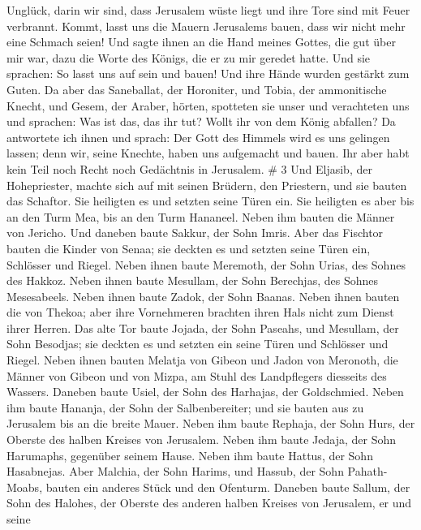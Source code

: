 Unglück, darin wir sind, dass Jerusalem wüste liegt und ihre Tore sind
mit Feuer verbrannt. Kommt, lasst uns die Mauern Jerusalems bauen, dass
wir nicht mehr eine Schmach seien!  Und sagte ihnen an die
Hand meines Gottes, die gut über mir war, dazu die Worte des Königs, die
er zu mir geredet hatte. Und sie sprachen: So lasst uns auf sein und
bauen! Und ihre Hände wurden gestärkt zum Guten.  Da aber
das Saneballat, der Horoniter, und Tobia, der ammonitische Knecht, und
Gesem, der Araber, hörten, spotteten sie unser und verachteten uns und
sprachen: Was ist das, das ihr tut? Wollt ihr von dem König abfallen?
 Da antwortete ich ihnen und sprach: Der Gott des Himmels
wird es uns gelingen lassen; denn wir, seine Knechte, haben uns
aufgemacht und bauen. Ihr aber habt kein Teil noch Recht noch Gedächtnis
in Jerusalem. \# 3  Und Eljasib, der Hohepriester, machte
sich auf mit seinen Brüdern, den Priestern, und sie bauten das Schaftor.
Sie heiligten es und setzten seine Türen ein. Sie heiligten es aber bis
an den Turm Mea, bis an den Turm Hananeel.  Neben ihm bauten
die Männer von Jericho. Und daneben baute Sakkur, der Sohn Imris.
 Aber das Fischtor bauten die Kinder von Senaa; sie deckten
es und setzten seine Türen ein, Schlösser und Riegel.  Neben
ihnen baute Meremoth, der Sohn Urias, des Sohnes des Hakkoz. Neben ihnen
baute Mesullam, der Sohn Berechjas, des Sohnes Mesesabeels. Neben ihnen
baute Zadok, der Sohn Baanas.  Neben ihnen bauten die von
Thekoa; aber ihre Vornehmeren brachten ihren Hals nicht zum Dienst ihrer
Herren.  Das alte Tor baute Jojada, der Sohn Paseahs, und
Mesullam, der Sohn Besodjas; sie deckten es und setzten ein seine Türen
und Schlösser und Riegel.  Neben ihnen bauten Melatja von
Gibeon und Jadon von Meronoth, die Männer von Gibeon und von Mizpa, am
Stuhl des Landpflegers diesseits des Wassers.  Daneben baute
Usiel, der Sohn des Harhajas, der Goldschmied. Neben ihm baute Hananja,
der Sohn der Salbenbereiter; und sie bauten aus zu Jerusalem bis an die
breite Mauer.  Neben ihm baute Rephaja, der Sohn Hurs, der
Oberste des halben Kreises von Jerusalem.  Neben ihm baute
Jedaja, der Sohn Harumaphs, gegenüber seinem Hause. Neben ihm baute
Hattus, der Sohn Hasabnejas.  Aber Malchia, der Sohn
Harims, und Hassub, der Sohn Pahath-Moabs, bauten ein anderes Stück und
den Ofenturm.  Daneben baute Sallum, der Sohn des Halohes,
der Oberste des anderen halben Kreises von Jerusalem, er und seine

